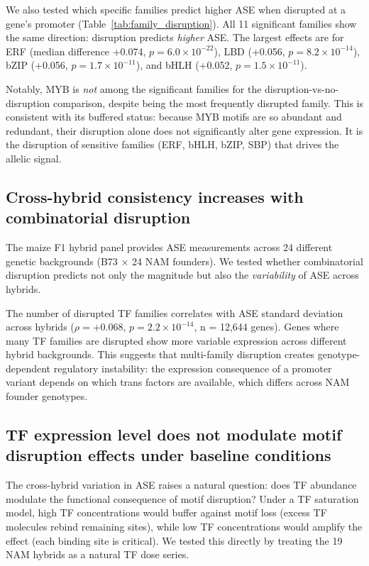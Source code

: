 \documentclass[11pt,a4paper]{article}
\begin{document}
We also tested which specific families predict higher ASE when disrupted at a gene's promoter (Table~\ref{tab:family_disruption}). All 11 significant families show the same direction: disruption predicts \textit{higher} ASE. The largest effects are for ERF (median difference +0.074, $p = 6.0 \times 10^{-22}$), LBD (+0.056, $p = 8.2 \times 10^{-14}$), bZIP (+0.056, $p = 1.7 \times 10^{-11}$), and bHLH (+0.052, $p = 1.5 \times 10^{-11}$).

Notably, MYB is \textit{not} among the significant families for the disruption-vs-no-disruption comparison, despite being the most frequently disrupted family. This is consistent with its buffered status: because MYB motifs are so abundant and redundant, their disruption alone does not significantly alter gene expression. It is the disruption of sensitive families (ERF, bHLH, bZIP, SBP) that drives the allelic signal.

\subsection{Cross-hybrid consistency increases with combinatorial disruption}

The maize F1 hybrid panel provides ASE measurements across 24 different genetic backgrounds (B73 $\times$ 24 NAM founders). We tested whether combinatorial disruption predicts not only the magnitude but also the \textit{variability} of ASE across hybrids.

The number of disrupted TF families correlates with ASE standard deviation across hybrids ($\rho = +0.068$, $p = 2.2 \times 10^{-14}$, n = 12,644 genes). Genes where many TF families are disrupted show more variable expression across different hybrid backgrounds. This suggests that multi-family disruption creates genotype-dependent regulatory instability: the expression consequence of a promoter variant depends on which trans factors are available, which differs across NAM founder genotypes.

\subsection{TF expression level does not modulate motif disruption effects under baseline conditions}

The cross-hybrid variation in ASE raises a natural question: does TF abundance modulate the functional consequence of motif disruption? Under a TF saturation model, high TF concentrations would buffer against motif loss (excess TF molecules rebind remaining sites), while low TF concentrations would amplify the effect (each binding site is critical). We tested this directly by treating the 19 NAM hybrids as a natural TF dose series.
\end{document}
